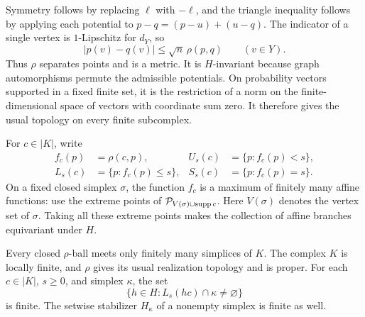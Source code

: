 Symmetry follows by replacing \(\ell\) with \(-\ell\), and the triangle
inequality follows by applying each potential to
\(p-q=(p-u)+(u-q)\).  The indicator of a single vertex is
\(1\)-Lipschitz for \(d_Y\), so
\begin{equation}
 |p(v)-q(v)|\leq\sqrt n\,\rho(p,q)
 \qquad(v\in Y).
 \label{eq:coordinate-control}
\end{equation}
Thus \(\rho\) separates points and is a metric.  It is \(H\)-invariant
because graph automorphisms permute the admissible potentials.  On
probability vectors supported in a fixed finite set, it is the
restriction of a norm on the finite-dimensional space of vectors with
coordinate sum zero.  It therefore gives the usual topology on every
finite subcomplex.

For \(c\in|K|\), write
\[
 \begin{aligned}
 f_c(p)&=\rho(c,p),& U_s(c)&=\{p:f_c(p)<s\},\\
 L_s(c)&=\{p:f_c(p)\leq s\},& S_s(c)&=\{p:f_c(p)=s\}.
 \end{aligned}
\]
On a fixed closed simplex \(\sigma\), the function \(f_c\) is a maximum
of finitely many affine functions: use the extreme points of
\(\mathcal P_{V(\sigma)\cup\operatorname{supp} c}\).  Here \(V(\sigma)\) denotes the
vertex set of \(\sigma\).  Taking all these extreme points makes the
collection of affine branches equivariant under \(H\).

\begin{lemma}\label{lem:proper}
Every closed \(\rho\)-ball meets only finitely many simplices of \(K\).
The complex \(K\) is locally finite, and \(\rho\) gives its usual
realization topology and is proper.  For each \(c\in|K|\), \(s\geq0\),
and simplex \(\kappa\), the set
\[
 \{h\in H:L_s(hc)\cap\kappa\ne\varnothing\}
\]
is finite.  The setwise stabilizer \(H_\kappa\) of a nonempty simplex
is finite as well.
\end{lemma}

